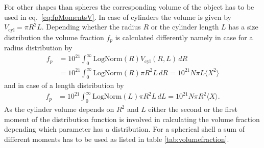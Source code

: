 For other shapes than spheres the corresponding volume of the object has to be used in eq.\ \ref{eq:fpMomentsV}.
In case of cylinders the volume is given by $V_\text{cyl}=\pi R^2 L$. Depending whether the radius $R$ or the
cylinder length $L$ has a size distribution the volume fraction $f_p$ is calculated differently namely
in case for a radius distribution by
\begin{align}
f_p &= 10^{21} \int_0^\infty \mathrm{LogNorm}(R) V_\text{cyl}(R,L) \, dR \label{eq:fpMomentsV} \\
    &= 10^{21} \int_0^\infty \mathrm{LogNorm}(R) \pi R^2L \, dR = 10^{21} N \pi L \langle X^2 \rangle
\end{align}
and in case of a length distribution by
\begin{align}
f_p %
    &= 10^{21} \int_0^\infty \mathrm{LogNorm}(L) \pi R^2L \, dL = 10^{21} N \pi R^2 \langle X \rangle .
\end{align}
As the cylinder volume depends on $R^2$  and $L$ either the second or the first moment of the distribution
function is involved in calculating the volume fraction depending which parameter has a distribution.
For a spherical shell a sum of different moments has to be used as listed in table \ref{tab:volumefraction}.

